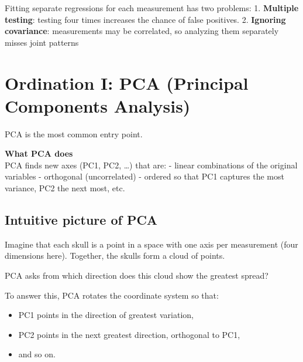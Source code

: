 \documentclass[
  letterpaper,
  8pt,
  a4paper]{book}
\providecommand{\tightlist}{%
  \setlength{\itemsep}{0pt}\setlength{\parskip}{0pt}}
\begin{document}
Fitting separate regressions for each measurement has two problems: 1.
\textbf{Multiple testing}: testing four times increases the chance of
false positives. 2. \textbf{Ignoring covariance}: measurements may be
correlated, so analyzing them separately misses joint patterns

\section*{Ordination I: PCA (Principal Components
Analysis)}\label{ordination-i-pca-principal-components-analysis}


PCA is the most common entry point.

\begin{tcolorbox}[enhanced jigsaw, arc=.35mm, bottomrule=.15mm, bottomtitle=1mm, breakable, colback=white, colbacktitle=quarto-callout-important-color!10!white, colframe=quarto-callout-important-color-frame, coltitle=black, left=2mm, leftrule=.75mm, opacityback=0, opacitybacktitle=0.6, rightrule=.15mm, title=\textcolor{quarto-callout-important-color}{\faExclamation}\hspace{0.5em}{Important}, titlerule=0mm, toprule=.15mm, toptitle=1mm]

\textbf{What PCA does}\\
PCA finds new axes (PC1, PC2, \ldots) that are: - linear combinations of
the original variables - orthogonal (uncorrelated) - ordered so that PC1
captures the most variance, PC2 the next most, etc.

\end{tcolorbox}

\subsection*{Intuitive picture of PCA}\label{intuitive-picture-of-pca}

Imagine that each skull is a point in a space with one axis per
measurement (four dimensions here). Together, the skulls form a cloud of
points.

PCA asks from which direction does this cloud show the greatest spread?

To answer this, PCA rotates the coordinate system so that:

\begin{itemize}
\tightlist
\item
  PC1 points in the direction of greatest variation,
\item
  PC2 points in the next greatest direction, orthogonal to PC1,
\item
  and so on.
\end{itemize}
\end{document}
